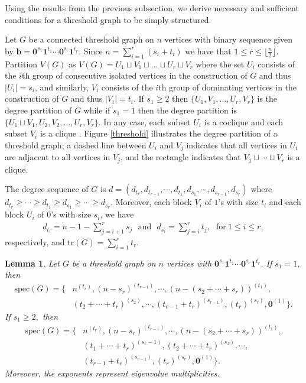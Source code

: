 \documentclass[preprint]{elsarticle}
\newcommand\spec{{\mathrm{spec}}}
\newtheorem{lema}[theorem]{Lemma}
\begin{document}
\bigskip

Using the results from the previous subsection, we derive necessary and sufficient conditions for a threshold graph to be simply structured. 

Let $G$ be a connected threshold graph on $n$ vertices with binary sequence given by $\mathbf{b}=\mathbf{0}^{s_1}\mathbf{1}^{t_1}\cdots\mathbf{0}^{s_r}\mathbf{1}^{t_r}.$ Since $n=\sum_{i=1}^r (s_i+t_i)$ we have that $1\leq r\leq \lfloor\frac{n}{2}\rfloor$. Partition $V(G)$ as $V(G)=U_1\sqcup V_1 \sqcup \ldots \sqcup U_r \sqcup V_r$ where the set $U_i$ consists of the $i$th group of consecutive isolated vertices in the construction of $G$ and thus $|U_i|=s_i$, and similarly, $V_i$ consists of the $i$th group of dominating vertices in the construction of $G$ and thus $|V_i|=t_i$. If $s_1\geq 2$ then $\{U_1, V_1, \ldots, U_r, V_r\}$ is the degree partition of $G$ while if $s_1=1$ then the degree partition is $\{U_1\sqcup V_1, U_2, V_2, \ldots, U_r, V_r\}$. In any case, each subset $U_i$ is a coclique and each subset $V_i$ is a clique \cite{antiregular}. Figure \ref{threshold} illustrates the degree partition of a threshold graph;
a dashed line between $U_i$ and $V_j$ indicates that all vertices in $U_i$ are adjacent to all vertices in $V_j$, and the rectangle indicates that $V_1 \sqcup \cdots \sqcup V_r$ is a clique.

The degree sequence of $G$ is $d=(d_{t_r}, d_{t_{r-1}}, \cdots, d_{t_1}, d_{s_1}, \cdots, d_{s_{r-1}}, d_{s_r})$ where $d_{t_r} \geq \cdots \geq d_{t_1} \geq d_{s_1} \geq \cdots \geq d_{s_r}$. Moreover, each block $V_i$ of $1$'s with size $t_i$ and each block $U_i$ of $0$'s with size $s_i$, we have 
\begin{align}\label{degrees}
    d_{t_i} = n - 1 - \displaystyle\sum_{j=i+1}^r s_j \ \ \ \text{and} \ \ \  d_{s_i} = \displaystyle\sum_{j=i}^r t_j, \ \ \ \text{for} \  1\leq i\leq r,  
\end{align}
respectively, and $\text{tr}(G)=\sum_{i=1}^{r}t_r$.

\begin{lema} 
\label{specG}
Let $G$ be a threshold graph on $n$ vertices with  $\mathbf{0}^{s_1}\mathbf{1}^{t_1}\cdots \mathbf{0}^{s_r}\mathbf{1}^{t_r}$. If $s_1=1$, then 
\begin{align*}
    \spec(G) = \Big\{ 
    & n^{(t_r)}, (n-s_r)^{(t_{r-1})}, \cdots, (n-(s_2+\cdots+s_r))^{(t_1)}, \\
    & (t_2+\cdots+t_r)^{(s_2)}, \cdots, (t_{r-1}+t_r)^{(s_{r-1})}, (t_r)^{(s_r)}, \mathbf{0}^{(1)} \Big\}.
\end{align*}
If $s_1 \geq 2,$ then 
\begin{align*}
    \spec(G) = \Big\{ 
    & n^{(t_r)}, (n-s_r)^{(t_{r-1})}, \cdots, (n-(s_2+\cdots+s_r))^{(t_1)}, \\
    & (t_1+\cdots+t_r)^{(s_1-1)}, (t_2+\cdots+t_r)^{(s_2)}, \cdots, \\ 
    & (t_{r-1}+t_r)^{(s_{r-1})}, (t_r)^{(s_r)}, \mathbf{0}^{(1)} \Big\}.
\end{align*}
Moreover, the exponents represent eigenvalue multiplicities.
\end{lema}
\end{document}
